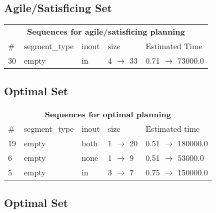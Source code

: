\documentclass{article}
\begin{document}
                         \subsection*{Agile/Satisficing Set}

                        \begin{center}
                        \begin{tabular}{@{}l|l|l|l|l@{}}
                        \multicolumn{5}{c}{\bf \large Sequences for agile/satisficing planning}\\
                        \# & segment\_type & inout & size & Estimated Time\\\midrule
                        30&empty&in&4 $\rightarrow$ 33&0.71 $\rightarrow$ 73000.0
                        \end{tabular}
                        \end{center}
                    
                            \subsection*{Optimal Set}

                            \begin{center}
                            \begin{tabular}{@{}l|l|l|l|l@{}}
                            \multicolumn{5}{c}{\bf \large Sequences for optimal planning}\\
                            \# & segment\_type & inout & size & Estimated time\\\midrule
                            19&empty&both&1 $\rightarrow$ 20&0.51 $\rightarrow$ 180000.0\\
6&empty&none&1 $\rightarrow$ 9&0.51 $\rightarrow$ 53000.0\\
5&empty&in&3 $\rightarrow$ 7&0.75 $\rightarrow$ 150000.0
                            \end{tabular}
                            \end{center}
                    
                                \subsection*{Optimal Set}
                                
\end{document}
